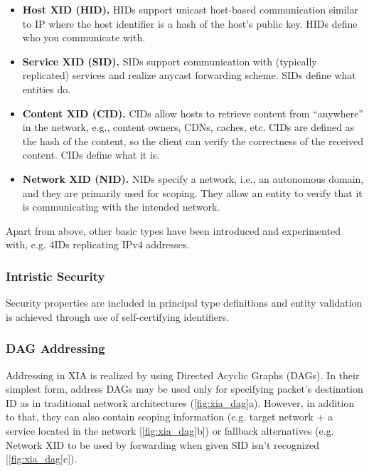                 \begin{itemize}
                    \item \textbf{Host XID (HID).} HIDs support unicast host-based communication similar to IP where the host identifier is a hash of the host’s public key. HIDs define who you communicate with.
                    \item \textbf{Service XID (SID).} SIDs support communication with (typically replicated) services and realize anycast forwarding scheme. SIDs define what entities do.
                    \item \textbf{Content XID (CID).} CIDs allow hosts to retrieve content from ``anywhere'' in the network, e.g., content owners, CDNs, caches, etc. CIDs are defined as the hash of the content, so the client can verify the correctness of the received content. CIDs define what it is.
                    \item \textbf{Network XID (NID).} NIDs specify a network, i.e., an autonomous domain, and they are primarily used for scoping. They allow an entity to verify that it is communicating with the intended network.
                \end{itemize}

                Apart from above, other basic types have been introduced and experimented with, e.g. 4IDs replicating IPv4 addresses.

            \subsubsection{Intristic Security}

                Security properties are included in principal type definitions and entity validation is achieved through use of self-certifying identifiers.

            \subsubsection{DAG Addressing}

                Addressing in XIA is realized by using Directed Acyclic Graphs (DAGs). In their simplest form, address DAGs may be used only for specifying packet's destination ID as in traditional network architectures (\ref{fig:xia_dag}a). However, in addition to that, they can also contain scoping information (e.g. target network + a service located in the network [\ref{fig:xia_dag}b]) or fallback alternatives (e.g. Network XID to be used by forwarding when given SID isn't recognized [\ref{fig:xia_dag}c]).

